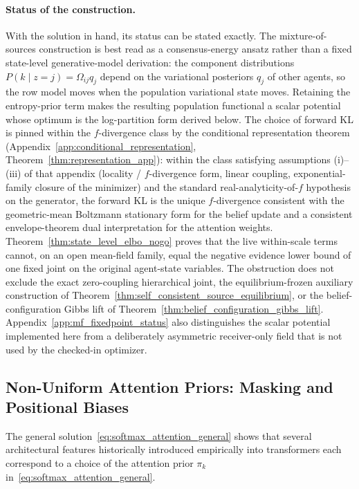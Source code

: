 \documentclass[11pt]{article}
\begin{document}
\paragraph{Status of the construction.} With the solution in hand, its status can be stated exactly. The mixture-of-sources construction is best read as a consensus-energy ansatz rather than a fixed state-level generative-model derivation: the component distributions $P(k \mid z{=}j) = \Omega_{ij}q_j$ depend on the variational posteriors $q_j$ of other agents, so the row model moves when the population variational state moves. Retaining the entropy-prior term makes the resulting population functional a scalar potential whose optimum is the log-partition form derived below. The choice of forward KL is pinned within the $f$-divergence class by the conditional representation theorem (Appendix~\ref{app:conditional_representation}, Theorem~\ref{thm:representation_app}): within the class satisfying assumptions (i)--(iii) of that appendix (locality / $f$-divergence form, linear coupling, exponential-family closure of the minimizer) and the standard real-analyticity-of-$f$ hypothesis on the generator, the forward KL is the unique $f$-divergence consistent with the geometric-mean Boltzmann stationary form for the belief update and a consistent envelope-theorem dual interpretation for the attention weights. Theorem~\ref{thm:state_level_elbo_nogo} proves that the live within-scale terms cannot, on an open mean-field family, equal the negative evidence lower bound of one fixed joint on the original agent-state variables. The obstruction does not exclude the exact zero-coupling hierarchical joint, the equilibrium-frozen auxiliary construction of Theorem~\ref{thm:self_consistent_source_equilibrium}, or the belief-configuration Gibbs lift of Theorem~\ref{thm:belief_configuration_gibbs_lift}. Appendix~\ref{app:mf_fixedpoint_status} also distinguishes the scalar potential implemented here from a deliberately asymmetric receiver-only field that is not used by the checked-in optimizer.

\subsection{Non-Uniform Attention Priors: Masking and Positional Biases}
\label{sec:nonuniform_priors}

The general solution~\eqref{eq:softmax_attention_general} shows that several architectural features historically introduced empirically into transformers each correspond to a choice of the attention prior $\pi_k$ in~\eqref{eq:softmax_attention_general}.
\end{document}
